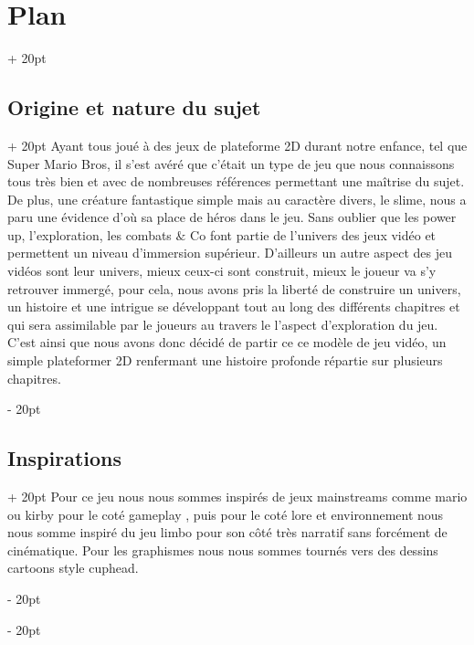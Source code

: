 \documentclass[a4paper, 12pt, twoside]{article}
\newcommand{\ind}[1][20pt]{\advance\leftskip + #1}
\newcommand{\deind}[1][20pt]{\advance\leftskip - #1}
\newenvironment{indt}[2][20pt]{#2 \par \ind[#1]}{\par \deind} %
\begin{document}
    \newpage

    \begin{indt}{\section{Plan}}
        \begin{indt}{\subsection{Origine et nature du sujet}}
            Ayant tous joué à des jeux de plateforme 2D durant notre enfance, tel que Super Mario Bros, il s'est avéré que c'était un type de jeu que nous connaissons tous très bien et avec de nombreuses références permettant une maîtrise du sujet. De plus, une créature fantastique simple mais au caractère divers, le slime, nous a paru une évidence d'où sa place de héros dans le jeu. Sans oublier que les power up, l'exploration, les combats $\&$ Co font partie de l'univers des jeux vidéo et permettent un niveau d'immersion supérieur. D'ailleurs un autre aspect des jeu vidéos sont leur univers, mieux ceux-ci sont construit, mieux le joueur va s'y retrouver immergé, pour cela, nous avons pris la liberté de construire un univers, un histoire et une intrigue se développant tout au long des différents chapitres et qui sera assimilable par le joueurs au travers le l'aspect d'exploration du jeu. C'est ainsi que nous avons donc décidé de partir ce ce modèle de jeu vidéo, un simple plateformer 2D renfermant une histoire profonde répartie sur plusieurs chapitres.
        \end{indt}

        \begin{indt}{\subsection{Inspirations}}
            Pour ce jeu nous nous sommes inspirés de jeux mainstreams comme mario ou kirby pour le coté gameplay , puis pour le coté lore et environnement nous nous somme inspiré du jeu limbo pour son côté très narratif sans forcément de cinématique. Pour les graphismes nous nous sommes tournés vers des dessins cartoons style cuphead.
        \end{indt}


\end{indt}
\end{document}
